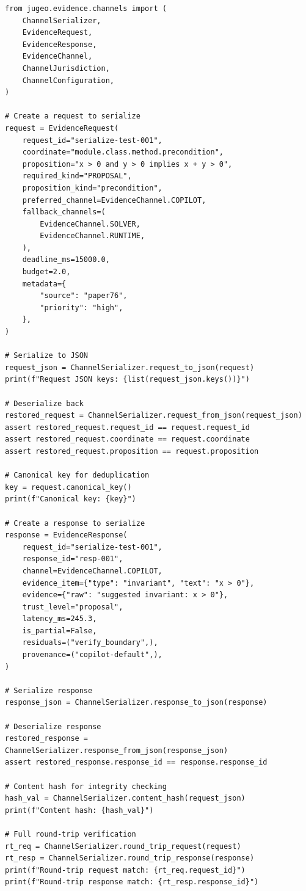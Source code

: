 \documentclass[11pt]{article}
\begin{document}
\begin{lstlisting}[style=jugeo-python, caption={Complete serialization round-trip demonstration.}, label=lst:serializer]
from jugeo.evidence.channels import (
    ChannelSerializer,
    EvidenceRequest,
    EvidenceResponse,
    EvidenceChannel,
    ChannelJurisdiction,
    ChannelConfiguration,
)

# Create a request to serialize
request = EvidenceRequest(
    request_id="serialize-test-001",
    coordinate="module.class.method.precondition",
    proposition="x > 0 and y > 0 implies x + y > 0",
    required_kind="PROPOSAL",
    proposition_kind="precondition",
    preferred_channel=EvidenceChannel.COPILOT,
    fallback_channels=(
        EvidenceChannel.SOLVER,
        EvidenceChannel.RUNTIME,
    ),
    deadline_ms=15000.0,
    budget=2.0,
    metadata={
        "source": "paper76",
        "priority": "high",
    },
)

# Serialize to JSON
request_json = ChannelSerializer.request_to_json(request)
print(f"Request JSON keys: {list(request_json.keys())}")

# Deserialize back
restored_request = ChannelSerializer.request_from_json(request_json)
assert restored_request.request_id == request.request_id
assert restored_request.coordinate == request.coordinate
assert restored_request.proposition == request.proposition

# Canonical key for deduplication
key = request.canonical_key()
print(f"Canonical key: {key}")

# Create a response to serialize
response = EvidenceResponse(
    request_id="serialize-test-001",
    response_id="resp-001",
    channel=EvidenceChannel.COPILOT,
    evidence_item={"type": "invariant", "text": "x > 0"},
    evidence={"raw": "suggested invariant: x > 0"},
    trust_level="proposal",
    latency_ms=245.3,
    is_partial=False,
    residuals=("verify_boundary",),
    provenance=("copilot-default",),
)

# Serialize response
response_json = ChannelSerializer.response_to_json(response)

# Deserialize response
restored_response = ChannelSerializer.response_from_json(response_json)
assert restored_response.response_id == response.response_id

# Content hash for integrity checking
hash_val = ChannelSerializer.content_hash(request_json)
print(f"Content hash: {hash_val}")

# Full round-trip verification
rt_req = ChannelSerializer.round_trip_request(request)
rt_resp = ChannelSerializer.round_trip_response(response)
print(f"Round-trip request match: {rt_req.request_id}")
print(f"Round-trip response match: {rt_resp.response_id}")


\end{lstlisting}
\end{document}
